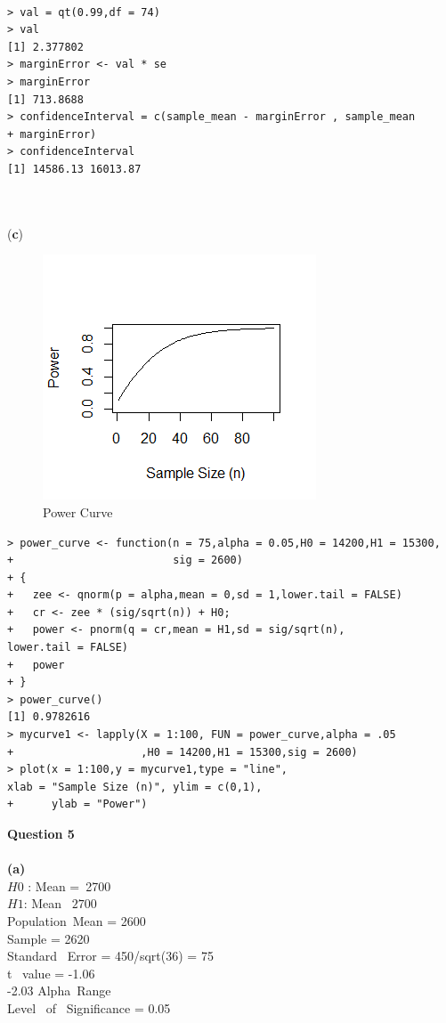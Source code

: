 \documentclass[12pt,letterpaper]{article}
\begin{document}
\begin{lstlisting}[label=R Code,caption=Q4(b) R Code Output]
      
> val = qt(0.99,df = 74)
> val
[1] 2.377802
> marginError <- val * se
> marginError
[1] 713.8688
> confidenceInterval = c(sample_mean - marginError , sample_mean 
+ marginError)
> confidenceInterval
[1] 14586.13 16013.87
          
\end{lstlisting}
\\
{(\textbf{c})}
\begin{figure}[!h]
   \centering
    \includegraphics[width=0.5\linewidth]{PC.png}
    \caption{Power Curve}
    \end{figure}

\begin{lstlisting}[label=R Code,caption=Q4(c) R Code Output]
> power_curve <- function(n = 75,alpha = 0.05,H0 = 14200,H1 = 15300,
+                         sig = 2600)
+ {
+   zee <- qnorm(p = alpha,mean = 0,sd = 1,lower.tail = FALSE)
+   cr <- zee * (sig/sqrt(n)) + H0;
+   power <- pnorm(q = cr,mean = H1,sd = sig/sqrt(n),
lower.tail = FALSE)
+   power
+ }
> power_curve()
[1] 0.9782616
> mycurve1 <- lapply(X = 1:100, FUN = power_curve,alpha = .05
+                    ,H0 = 14200,H1 = 15300,sig = 2600)
> plot(x = 1:100,y = mycurve1,type = "line",
xlab = "Sample Size (n)", ylim = c(0,1),
+      ylab = "Power")
\end{lstlisting}
{\Large \textbf{Question 5}} \\
\\
{\textbf{(a)}} \\
$H0$ : Mean =\ 2700\\
	  $H1$: Mean \ne\ $2700$
	  \\
	  Population\ Mean = 2600\\
	  Sample \Mean = 2620\\
	  Standard \ Error = 450/sqrt(36) = 75\\
	  t \ value = -1.06\\
	   -2.03 \leq Alpha\ Range \\
	  Level \ of \ Significance = 0.05\\
      
\end{document}

